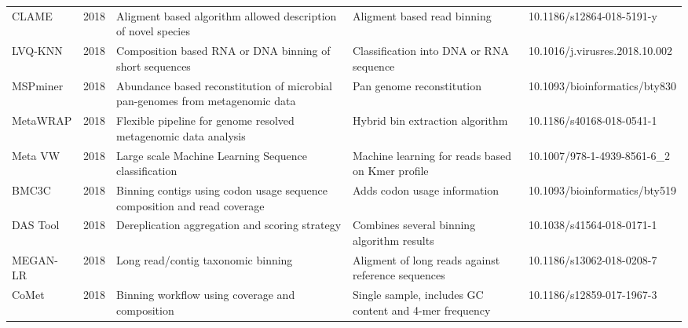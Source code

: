 \begin{tabular}{p{2cm}|p{0.6cm}|p{4cm}|p{4cm}|p{3.4cm}}
              CLAME \cite{benavides2018clame} &  2018 &                             Aligment based algorithm allowed description of novel species &                                                     Aligment based read binning &      10.1186/s12864-018-5191-y \\
                   LVQ-KNN \cite{belka2018lv} &  2018 &                                   Composition based RNA or DNA binning of short sequences &                                         Classification into DNA or RNA sequence & 10.1016/j.virusres.2018.10.002 \\
            MSPminer \cite{plaza2019mspminer} &  2018 &             Abundance based reconstitution of microbial pan-genomes from metagenomic data &                                                       Pan genome reconstitution &  10.1093/bioinformatics/bty830 \\
         MetaWRAP \cite{Uritskiy2018metawrap} &  2018 &                           Flexible pipeline for genome resolved metagenomic data analysis &                                                 Hybrid bin extraction algorithm &      10.1186/s40168-018-0541-1 \\
              Meta VW \cite{vervier2016large} &  2018 &                                      Large scale Machine Learning Sequence classification &                                Machine learning for reads based on Kmer profile &    10.1007/978-1-4939-8561-6_2 \\
                     BMC3C \cite{Yu2018BMC3C} &  2018 &                  Binning contigs using codon usage sequence composition and read coverage &                                                    Adds codon usage information &  10.1093/bioinformatics/bty519 \\
           DAS Tool \cite{sieber2018recovery} &  2018 &                                            Dereplication aggregation and scoring strategy &                                      Combines several binning algorithm results &      10.1038/s41564-018-0171-1 \\
               MEGAN-LR \cite{huson2018megan} &  2018 &                                                       Long read/contig taxonomic binning  &                              Aligment of long reads against reference sequences &      10.1186/s13062-018-0208-7 \\
                 CoMet \cite{herath2017comet} &  2018 &                                           Binning workflow using coverage and composition &                          Single sample, includes GC content and 4-mer frequency &      10.1186/s12859-017-1967-3 \\

\end{tabular}

